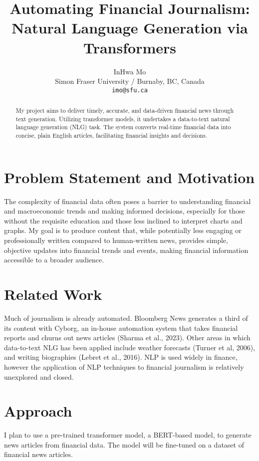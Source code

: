 \documentclass[11pt]{article}
\title{Automating Financial Journalism: Natural Language Generation via Transformers}
\author{InHwa Mo \\
    Simon Fraser University / Burnaby, BC, Canada \\
    \texttt{imo@sfu.ca} \\}
\begin{document}
\maketitle
\begin{abstract}
    My project aims to deliver timely, accurate, and data-driven financial news through text generation. Utilizing transformer models, it undertakes a data-to-text natural language generation (NLG) task. The system converts real-time financial data into concise, plain English articles, facilitating financial insights and decisions.
\end{abstract}

\section{Problem Statement and Motivation}
The complexity of financial data often poses a barrier to understanding financial and macroeconomic trends and making informed decisions, especially for those without the requisite education and those less inclined to interpret charts and graphs. My goal is to produce content that, while potentially less engaging or professionally written compared to human-written news, provides simple, objective updates into financial trends and events, making financial information accessible to a broader audience.

\section{Related Work}

Much of journalism is already automated. Bloomberg News generates a third of its content with Cyborg, an in-house automation system that takes financial reports and churns out news articles (Sharma et al., 2023). Other areas in which data-to-text NLG has been applied include weather forecasts (Turner et al, 2006), and writing biographies (Lebret et al., 2016). NLP is used widely in finance, however the application of NLP techniques to financial journalism is relatively unexplored and closed.

\section{Approach}
I plan to use a pre-trained transformer model, a BERT-based model, to generate news articles from financial data. The model will be fine-tuned on a dataset of financial news articles. 
\end{document}
